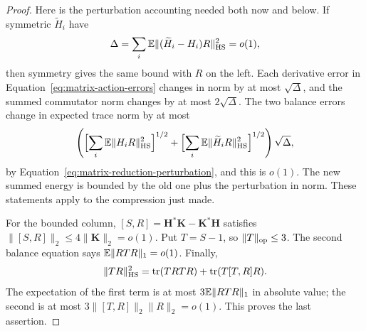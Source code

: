 \begin{proof}
Here is the perturbation accounting needed both now and below.  If
symmetric $\widetilde H_i$ have
\begin{equation}\label{eq:matrix-weighted-change}
 \Delta=\sum_i\mathbb E\|(\widetilde H_i-H_i)R\|_{\mathrm{HS}}^2=o(1),
\end{equation}
then symmetry gives the same bound with $R$ on the left.  Each derivative
error in Equation~\eqref{eq:matrix-action-errors} changes in norm by at most
$\sqrt\Delta$, and the summed commutator norm changes by at most
$2\sqrt\Delta$.  The two balance errors change in expected trace norm by
at most
\[
 \left(\Bigl[\sum_i\mathbb E\|H_iR\|_{\mathrm{HS}}^2\Bigr]^{1/2}
 +\Bigl[\sum_i\mathbb E\|\widetilde H_iR\|_{\mathrm{HS}}^2\Bigr]^{1/2}\right)\sqrt\Delta,
\]
by Equation~\eqref{eq:matrix-reduction-perturbation}, and this is $o(1)$.
The new summed energy is bounded by the old one plus the perturbation in
norm.  These statements apply to the compression just made.

For the bounded column, $[S,R]=\mathbf H^*\mathbf K-\mathbf K^*\mathbf H$
satisfies $\|[S,R]\|_2\le4\|\mathbf K\|_2=o(1)$.
Put $T=S-1$, so $\|T\|_{\mathrm{op}}\le3$.
The second balance equation says $\mathbb E\|RTR\|_1=o(1)$.  Finally,
\[
 \|TR\|_{\mathrm{HS}}^2
 =\operatorname{tr}(TRTR)+\operatorname{tr}(T[T,R]R).
\]
The expectation of the first term is at most $3\mathbb E\|RTR\|_1$ in absolute
value; the second is at most
$3\|[T,R]\|_2\|R\|_2=o(1)$.  This proves the last assertion.
\end{proof}

